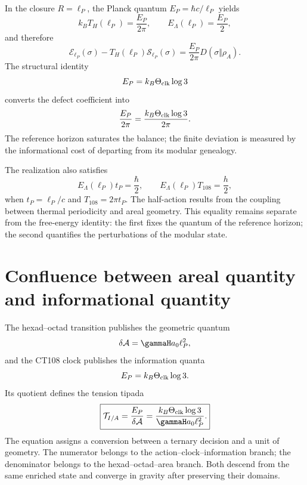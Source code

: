 In the closure \(R=\ell_P\), the Planck quantum
\(E_P=\hbar c/\ell_P\) yields
\begin{equation}
 k_BT_H(\ell_P)=\frac{E_P}{2\pi},
 \qquad
 E_\Lambda(\ell_P)=\frac{E_P}{2},
 \label{eq:rm-info-planck-horizon-data}
\end{equation}
and therefore
\begin{equation}
 \boxed{
 \mathcal E_{\ell_P}(\sigma)
 -T_H(\ell_P)\mathcal S_{\ell_P}(\sigma)
 =\frac{E_P}{2\pi}D(\sigma\Vert\rho_A).}
 \label{eq:rm-info-planck-free-energy}
\end{equation}
The structural identity
\begin{equation}
 E_P=k_B\Theta_{\rm clk}\log3
 \label{eq:rm-info-planck-trit}
\end{equation}
converts the defect coefficient into
\begin{equation}
 \frac{E_P}{2\pi}
 =\frac{k_B\Theta_{\rm clk}\log3}{2\pi}.
 \label{eq:rm-info-trit-free-energy}
\end{equation}
The reference horizon saturates the balance; the finite deviation is
measured by the informational cost of departing from its modular genealogy.

The realization also satisfies
\begin{equation}
 E_\Lambda(\ell_P)t_P=\frac{\hbar}{2},
 \qquad
 E_\Lambda(\ell_P)T_{108}=\frac h2,
 \label{eq:rm-info-half-action}
\end{equation}
when \(t_P=\ell_P/c\) and \(T_{108}=2\pi t_P\). The half-action
results from the coupling between thermal periodicity and areal geometry.
This equality remains separate from the free-energy identity: the
first fixes the quantum of the reference horizon; the second quantifies
the perturbations of the modular state.

\section{Confluence between areal quantity and informational quantity}

The hexad--octad transition publishes the geometric quantum
\begin{equation}
 \delta\mathcal A
 =\gammaH a_0\ell_P^2,
 \label{eq:rm-info-area-quantum}
\end{equation}
and the CT108 clock publishes the information quanta
\begin{equation}
 E_P=k_B\Theta_{\rm clk}\log3.
 \label{eq:rm-info-energy-quantum}
\end{equation}
Its quotient defines the tension tipada
\begin{equation}
 \boxed{
 \mathcal T_{I/A}
 =\frac{E_P}{\delta\mathcal A}
 =\frac{k_B\Theta_{\rm clk}\log3}
 {\gammaH a_0\ell_P^2}.}
 \label{eq:rm-info-tension-information-area}
\end{equation}
The equation assigns a conversion between a ternary decision and a
unit of geometry. The numerator belongs to the
action--clock--information branch; the denominator belongs to the
hexad--octad--area branch. Both descend from the same enriched state and
converge in gravity after preserving their domains.

